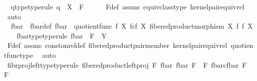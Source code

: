 \begin{isabellebody}
\ \ q{\isacharunderscore}{\kern0pt}type{\isacharbrackleft}{\kern0pt}type{\isacharunderscore}{\kern0pt}rule{\isacharbrackright}{\kern0pt}{\isacharcolon}{\kern0pt}\ {\isachardoublequoteopen}q\ {\isacharcolon}{\kern0pt}\ X\ {\isasymrightarrow}\ F{\isachardoublequoteclose}\isanewline
\ \ \ \ \isamarkupfalse%
\ F{\isacharunderscore}{\kern0pt}def\ assms{\isacharparenleft}{\kern0pt}{}{\isacharparenright}{\kern0pt}\ equiv{\isacharunderscore}{\kern0pt}class{\isacharunderscore}{\kern0pt}type\ kernel{\isacharunderscore}{\kern0pt}pair{\isacharunderscore}{\kern0pt}equiv{\isacharunderscore}{\kern0pt}rel\ \isamarkupfalse%
\ auto\isanewline
\ \ \isamarkupfalse%
\ \ f{\isacharunderscore}{\kern0pt}bar\ \ f{\isacharunderscore}{\kern0pt}bar{\isacharunderscore}{\kern0pt}def{\isacharcolon}{\kern0pt}\ {\isachardoublequoteopen}f{\isacharunderscore}{\kern0pt}bar\ {\isacharequal}{\kern0pt}\ quotient{\isacharunderscore}{\kern0pt}func\ f\ {\isacharparenleft}{\kern0pt}X\ \isactrlbsub f\isactrlesub {\isasymtimes}\isactrlsub c\isactrlbsub f\isactrlesub \ X{\isacharcomma}{\kern0pt}\ fibered{\isacharunderscore}{\kern0pt}product{\isacharunderscore}{\kern0pt}morphism\ X\ f\ f\ X{\isacharparenright}{\kern0pt}{\isachardoublequoteclose}\ \isanewline
\ \ f{\isacharunderscore}{\kern0pt}bar{\isacharunderscore}{\kern0pt}type{\isacharbrackleft}{\kern0pt}type{\isacharunderscore}{\kern0pt}rule{\isacharbrackright}{\kern0pt}{\isacharcolon}{\kern0pt}\ {\isachardoublequoteopen}f{\isacharunderscore}{\kern0pt}bar\ {\isacharcolon}{\kern0pt}\ F\ {\isasymrightarrow}\ Y{\isachardoublequoteclose}\ \isanewline
\ \ \ \ \isamarkupfalse%
\ F{\isacharunderscore}{\kern0pt}def\ assms{\isacharparenleft}{\kern0pt}{}{\isacharparenright}{\kern0pt}\ const{\isacharunderscore}{\kern0pt}on{\isacharunderscore}{\kern0pt}rel{\isacharunderscore}{\kern0pt}def\ fibered{\isacharunderscore}{\kern0pt}product{\isacharunderscore}{\kern0pt}pair{\isacharunderscore}{\kern0pt}member\ kernel{\isacharunderscore}{\kern0pt}pair{\isacharunderscore}{\kern0pt}equiv{\isacharunderscore}{\kern0pt}rel\ quotient{\isacharunderscore}{\kern0pt}func{\isacharunderscore}{\kern0pt}type\ \isamarkupfalse%
\ auto\isanewline
\ \ \isamarkupfalse%
\ fibr{\isacharunderscore}{\kern0pt}proj{\isacharunderscore}{\kern0pt}left{\isacharunderscore}{\kern0pt}type{\isacharbrackleft}{\kern0pt}type{\isacharunderscore}{\kern0pt}rule{\isacharbrackright}{\kern0pt}{\isacharcolon}{\kern0pt}\ {\isachardoublequoteopen}fibered{\isacharunderscore}{\kern0pt}product{\isacharunderscore}{\kern0pt}left{\isacharunderscore}{\kern0pt}proj\ F\ {\isacharparenleft}{\kern0pt}f{\isacharunderscore}{\kern0pt}bar{\isacharparenright}{\kern0pt}\ {\isacharparenleft}{\kern0pt}f{\isacharunderscore}{\kern0pt}bar{\isacharparenright}{\kern0pt}\ F\ {\isacharcolon}{\kern0pt}\ F\ \isactrlbsub {\isacharparenleft}{\kern0pt}f{\isacharunderscore}{\kern0pt}bar{\isacharparenright}{\kern0pt}\isactrlesub {\isasymtimes}\isactrlsub c\isactrlbsub {\isacharparenleft}{\kern0pt}f{\isacharunderscore}{\kern0pt}bar{\isacharparenright}{\kern0pt}\isactrlesub \ F\ {\isasymrightarrow}\ F{\isachardoublequoteclose}\isanewline

\end{isabellebody}
